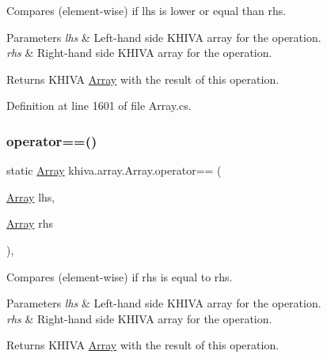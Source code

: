 Compares (element-\/wise) if lhs is lower or equal than rhs. 


\begin{DoxyParams}{Parameters}
{\em lhs} & Left-\/hand side K\+H\+I\+VA array for the operation.\\
\hline
{\em rhs} & Right-\/hand side K\+H\+I\+VA array for the operation.\\
\hline
\end{DoxyParams}
\begin{DoxyReturn}{Returns}
K\+H\+I\+VA \mbox{\hyperlink{classkhiva_1_1array_1_1_array}{Array}} with the result of this operation.
\end{DoxyReturn}


Definition at line 1601 of file Array.\+cs.

\mbox{\label{classkhiva_1_1array_1_1_array_a258905dc9565c1727d9a38ae73d2b110}} 
\subsubsection{\texorpdfstring{operator==()}{operator==()}}
{\footnotesize\ttfamily static \mbox{\hyperlink{classkhiva_1_1array_1_1_array}{Array}} khiva.\+array.\+Array.\+operator== (\begin{DoxyParamCaption}\item[{\mbox{\hyperlink{classkhiva_1_1array_1_1_array}{Array}}}]{lhs,  }\item[{\mbox{\hyperlink{classkhiva_1_1array_1_1_array}{Array}}}]{rhs }\end{DoxyParamCaption})\hspace{0.3cm}{\ttfamily [inline]}, {\ttfamily [static]}}



Compares (element-\/wise) if rhs is equal to rhs. 


\begin{DoxyParams}{Parameters}
{\em lhs} & Left-\/hand side K\+H\+I\+VA array for the operation.\\
\hline
{\em rhs} & Right-\/hand side K\+H\+I\+VA array for the operation.\\
\hline
\end{DoxyParams}
\begin{DoxyReturn}{Returns}
K\+H\+I\+VA \mbox{\hyperlink{classkhiva_1_1array_1_1_array}{Array}} with the result of this operation.
\end{DoxyReturn}


